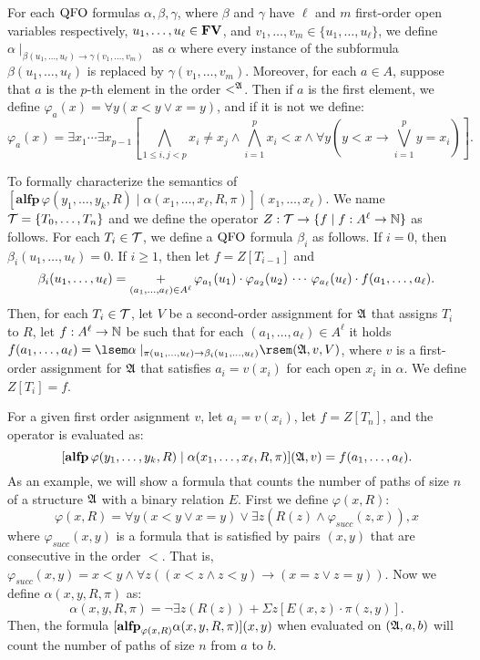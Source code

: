 For each ${\rm QFO}$ formulas $\alpha, \beta, \gamma$, where $\beta$ and $\gamma$ have $\ell$ and $m$ first-order open variables respectively, $u_1,\ldots,u_{\ell} \in \mathbf{FV}$, and $v_1,\ldots,v_m \in \{u_1,\ldots,u_{\ell}\}$, we define $\alpha\mid_{\beta(u_1,\ldots,u_{\ell})\to\gamma(v_1,\ldots,v_{m})}$ as $\alpha$ where every instance of the subformula $\beta(u_1,\ldots,u_{\ell})$ is replaced by $\gamma(v_1,\ldots,v_{m})$. Moreover, for each $a\in A$, suppose that $a$ is the $p$-th element in the order $<^{\mathfrak{A}}$. Then if $a$ is the first element, we define $\varphi_a(x) = \forall y(x < y \vee x = y)$, and if it is not we define:
$$
\varphi_a(x) = \exists x_1 \cdots \exists x_{p-1}[\bigwedge_{1\leq i,j < p}x_i\neq x_j \wedge \bigwedge_{i = 1}^p x_i < x \wedge \forall y(y < x \to \bigvee_{i = 1}^p y = x_i)].
$$

To formally characterize the semantics of $[\textbf{alfp}\,\varphi(y_1,\ldots,y_k,R)\mid\alpha(x_1,\ldots,x_{\ell},R,\pi)](x_1,\ldots,x_{\ell})$. %
We name $\mathcal{T} = \{T_0,\ldots,T_n\}$ and we define the operator $Z:\mathcal{T} \to \{f\mid f:A^{\ell}\to\mathbb{N}\}$ as follows. For each $T_i \in \mathcal{T}$, we define a ${\rm QFO}$ formula $\beta_i$ as follows. If $i = 0$, then $\beta_i(u_1,\ldots,u_{\ell}) = 0$. If $i \geq 1$, then let $f = Z[T_{i-1}]$ and
$$
\beta_i(u_1,\ldots,u_{\ell}) = \operatorname*{+}_{(a_1,\ldots,a_{\ell})\in A^{\ell}} \varphi_{a_1}(u_1)\cdot\varphi_{a_2}(u_2)\,\cdots\,\varphi_{a_{\ell}}(u_{\ell})\cdot f(a_1,\ldots,a_{\ell}).
$$
Then, for each $T_i \in \mathcal{T}$, let $V$ be a second-order assignment for $\mathfrak{A}$ that assigns $T_i$ to $R$, let $f: A^{\ell}\to\mathbb{N}$ be such that for each $(a_1,\ldots,a_{\ell})\in A^{\ell}$ it holds $f(a_1,\ldots,a_{\ell}) = \sem{\alpha\mid_{\pi(u_1,\ldots,u_{\ell})\to \beta_i(u_1,\ldots,u_{\ell})}}(\A,v,V)$, where $v$ is a first-order assignment for $\mathfrak{A}$ that satisfies $a_i = v(x_i)$ for each open $x_i$ in $\alpha$. We define $Z[T_i] = f$.

For a given first order asignment $v$, let $a_i = v(x_i)$, let $f = Z[T_n]$, and the operator is evaluated as:
$$
[\textbf{alfp}\,\varphi(y_1,\ldots,y_k,R)\mid\alpha(x_1,\ldots,x_{\ell},R,\pi)](\mathfrak{A},v) = f(a_1,\ldots,a_{\ell}).
$$
As an example, we will show a formula that counts the number of paths of size $n$ of a structure $\mathfrak{A}$ with a binary relation $E$. First we define $\varphi(x,R)$:
$$
\varphi(x,R) = \forall y(x < y \vee x = y) \vee \exists z(R(z) \wedge \varphi_{succ}(z,x)),x
$$
where $\varphi_{succ}(x,y)$ is a formula that is satisfied by pairs $(x,y)$ that are consecutive in the order $<$. That is, $\varphi_{succ}(x,y) = x < y \wedge \forall z((x < z \wedge z < y) \to (x = z \vee z = y) )$. Now we define $\alpha(x,y,R,\pi)$ as:
$$
\alpha(x,y,R,\pi) = \neg \exists z(R(z)) + \Sigma z[E(x,z)\cdot \pi(z,y)].
$$
Then, the formula $[{\bf alfp}_{\varphi(x,R)} \alpha(x,y,R,\pi)](x,y)$ when evaluated on $(\mathfrak{A},a,b)$ will count the number of paths of size $n$ from $a$ to $b$.

